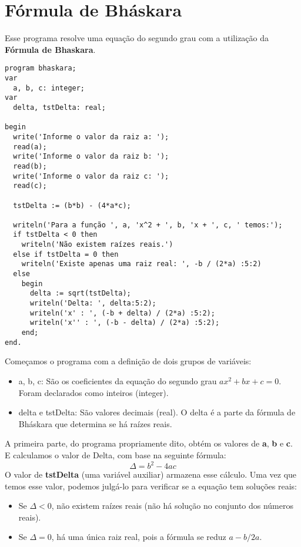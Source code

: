 \section{Fórmula de Bháskara}
Esse programa resolve uma equação do segundo grau com a utilização da \textbf{Fórmula de Bhaskara}.
\begin{lstlisting}[]
program bhaskara;
var
  a, b, c: integer;
var
  delta, tstDelta: real;

begin
  write('Informe o valor da raiz a: ');
  read(a);
  write('Informe o valor da raiz b: ');
  read(b);
  write('Informe o valor da raiz c: ');
  read(c);

  tstDelta := (b*b) - (4*a*c);

  writeln('Para a função ', a, 'x^2 + ', b, 'x + ', c, ' temos:');
  if tstDelta < 0 then
    writeln('Não existem raízes reais.')
  else if tstDelta = 0 then
    writeln('Existe apenas uma raiz real: ', -b / (2*a) :5:2)
  else
    begin
      delta := sqrt(tstDelta);
      writeln('Delta: ', delta:5:2);
      writeln('x' : ', (-b + delta) / (2*a) :5:2);
      writeln('x'' : ', (-b - delta) / (2*a) :5:2);
    end;
end.	
\end{lstlisting}

Começamos o programa com a definição de dois grupos de variáveis:  \vspace{-1em}
\begin{itemize}
	\item a, b, c: São os coeficientes da equação do segundo grau $ax^2 + bx + c = 0$. Foram declarados como inteiros (integer).
	\item delta e tstDelta: São valores decimais (real). O delta é a parte da fórmula de Bháskara que determina se há raízes reais.
\end{itemize}

A primeira parte, do programa propriamente dito, obtém os valores de \textbf{a}, \textbf{b} e \textbf{c}. E calculamos o valor de Delta, com base na seguinte fórmula:
\[
\Delta = b^2 - 4ac
\]
O valor de \textbf{tstDelta} (uma variável auxiliar) armazena esse cálculo. Uma vez que temos esse valor, podemos julgá-lo para verificar se a equação tem soluções reais: \vspace{-1em}
\begin{itemize}
	\item Se $\Delta < 0$, não existem raízes reais (não há solução no conjunto dos números reais).
	\item Se $\Delta = 0$, há uma única raiz real, pois a fórmula se reduz $a - b / 2a$.
\end{itemize}

